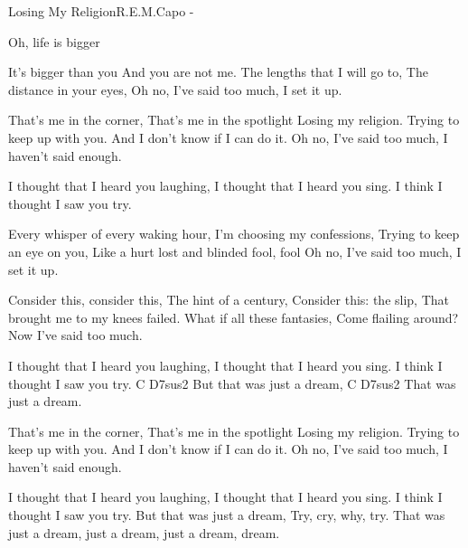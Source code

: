 \begin{song}{Losing My Religion}{R.E.M.}{Capo -}

Oh, life is bigger

It's bigger than you
And you are not me. The lengths that I will go to,
The distance in your eyes, Oh no, I've said too much,
I set it up.

That's me in the corner, That's me in the spotlight
Losing my religion. Trying to keep up with you.
And I don't know if I can do it. Oh no, I've said too much,
I haven't said enough.

I thought that I heard you laughing, I thought that I heard you sing.
I  think I thought I saw  you try.

Every whisper of every waking hour, I'm choosing my confessions,
Trying to keep an eye on you, Like a hurt lost and blinded fool, fool
Oh no, I've said too much, I set it up.

Consider this, consider this, The hint of a century,
Consider this: the slip, That brought me to my knees failed.
What if all these fantasies, Come    flailing around?
Now I've said too much.

I thought that I heard you laughing, I thought that I heard you sing.
I  think I thought I saw you try.
    C               D7sus2
But that was just a dream,
C               D7sus2
That was just a dream.

That's me in the corner, That's me in the spotlight
Losing my religion. Trying to keep up with you.
And I don't know if I can do it. Oh no, I've said too much,
I haven't said enough.

I thought that I heard you laughing, I thought that I heard you sing.
I  think I thought I saw you try. But that was just a dream,
Try, cry,   why,   try.
That was just a dream,    just a dream, just a dream, dream.
\end{song}
